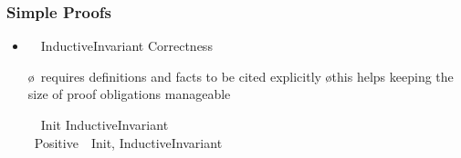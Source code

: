\documentclass[fleqn]{beamer}
\begin{document}
\begin{frame}
  \frametitle{Simple Proofs}

  \begin{itemize}
  \item {}

    \medskip

    \qquad\begin{tlablock}
      \LEMMA\ \ InductiveInvariant \implies Correctness\\
    \end{tlablock}

\pause



    \begin{itemize}
    \o \tlaps\ requires definitions and facts to be cited explicitly
    \o this helps keeping the size of proof obligations manageable
    \end{itemize}

\pause
  \oo {}

    \medskip

    \qquad\begin{tlablock}
      \LEMMA\ \ Init \implies InductiveInvariant\\
      \BY\ Positive\ \DEFS\ Init, InductiveInvariant
    \end{tlablock}

  \oo {}
  \end{itemize}
  
\end{frame}
\end{document}
